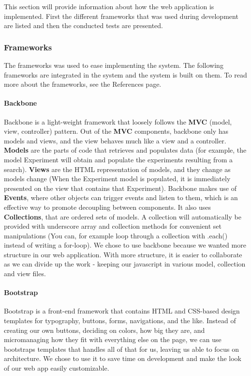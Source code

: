 This section will provide information about how the web application is implemented. First the different frameworks that was used during development are listed and then the conducted tests are presented. 

\subsubsection{Frameworks}
\label{sec:web_frame}
The frameworks was used to ease implementing the system. The following frameworks are integrated in the system and the system is built on them. To read more about the frameworks, see the References page.

\paragraph{Backbone}
Backbone\cite{web_1} is a light-weight framework that loosely follows the \textbf{MVC} (model, view, controller) pattern. Out of the \textbf{MVC} components, backbone only has models and views, and the view behaves much like a view and a controller. \textbf{Models} are the parts of code that retrieves and populates data (for example, the model Experiment will obtain and populate the experiments resulting from a search). \textbf{Views} are the HTML representation of models, and they change as models change (When the Experiment model is populated, it is immediately presented on the view that contains that Experiment).
Backbone makes use of \textbf{Events}, where other objects can trigger events and listen to them, which is an effective way to promote decoupling between components. It also uses \textbf{Collections}, that are ordered sets of models. A collection will automatically be provided with underscore array and collection methods for convenient set manipulations (You can, for example loop through a collection with .each() instead of writing a for-loop). We chose to use backbone because we wanted more structure in our web application. With more structure, it is easier to collaborate as we can divide up the work - keeping our javascript in various model, collection and view files.

\paragraph{Bootstrap}
Bootstrap\cite{web_2} is a front-end framework that contains HTML and CSS-based design templates for typography, buttons, forms, navigations, and the like. Instead of creating our own buttons, deciding on colors, how big they are, and micromanaging how they fit with everything else on the page, we can use bootstraps templates that handles all of that for us, leaving us able to focus on architecture. We chose to use it to save time on development and make the look of our web app easily customizable.

